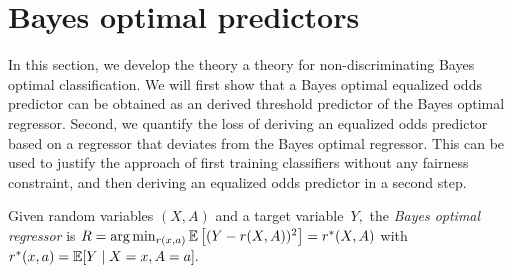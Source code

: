 \section{Bayes optimal predictors}
\label{sec:bayes}
%
In this section, we develop the theory a theory for non-discriminating
Bayes optimal classification.  We will first show that a Bayes optimal
equalized odds predictor can be obtained as an derived threshold
predictor of the Bayes optimal regressor. Second, we quantify the loss
of deriving an equalized odds predictor based on a regressor that
deviates from the Bayes optimal regressor. This can be used to justify
the approach of first training classifiers without any fairness
constraint, and then deriving an equalized odds predictor in a second
step.
%
\begin{definition}
  Given random variables $(X,A)$ and a target variable~$Y,$ the
  \emph{Bayes optimal regressor} is
  $R=\arg\min_{r(x,a)}\mathbb{E}\left[(Y-r(X,A))^2\right]=r^*(X,A)$ with
  $r^*(x,a) = \mathbb{E}[Y \mid X=x, A=a].$
\end{definition}

